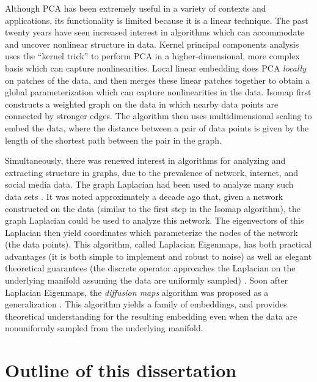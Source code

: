 Although PCA has been extremely useful in a variety of contexts and applications, its functionality is limited because it is a linear technique. 
%
The past twenty years have seen increased interest in algorithms which can accommodate and uncover nonlinear structure in data.
%
Kernel principal components analysis \cite{scholkopf1997kernel} uses the ``kernel trick'' to perform PCA in a higher-dimensional, more complex basis which can capture nonlinearities. 
%
Local linear embedding \cite{roweis2000nonlinear} does PCA {\em locally} on patches of the data, and then merges these linear patches together to obtain a global parameterization which can capture nonlinearities in the data. 
%
Isomap \cite{tenenbaum2000global} first constructs a weighted graph on the data in which nearby data points are connected by stronger edges.
%
The algorithm then uses multidimensional scaling \cite{joseph1978multidimensional} to embed the data, where the distance between a pair of data points is given by the length of the shortest path between the pair in the graph. 

Simultaneously, there was renewed interest in algorithms for analyzing and extracting structure in graphs, due to the prevalence of network, internet, and social media data. 
%
The graph Laplacian had been used to analyze many such data sets \cite{shi2000normalized, ng2002spectral}. 
%
It was noted approximately a decade ago that, given a network constructed on the data (similar to the first step in the Isomap algorithm), the graph Laplacian could be used to analyze this network. 
%
The eigenvectors of this Laplacian then yield coordinates which parameterize the nodes of the network (the data points). 
%
This algorithm, called Laplacian Eigenmaps, has both practical advantages (it is both simple to implement and robust to noise) as well as elegant theoretical guarantees (the discrete operator approaches the Laplacian on the underlying manifold assuming the data are uniformly sampled) \cite{Belkin2003}. 
%
Soon after Laplacian Eigenmaps, the {\em diffusion maps} algorithm was proposed as a generalization \cite{coifman2005geometric, coifman2006geometric}. 
%
This algorithm yields a family of embeddings, and provides theoretical understanding for the resulting embedding even when the data are nonuniformly sampled from the underlying manifold. 


\section{Outline of this dissertation}

